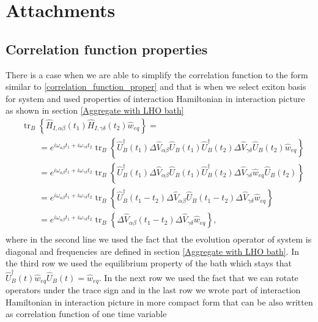 \chapter{Attachments}

\section{Correlation function properties}
\label{Correlation function properties}
There is a case when we are able to simplify the correlation function to the form similar to \ref{correlation_function_proper} and that is when we select exiton basis for system and used properties of interaction Hamiltonian in interaction picture as shown in section \ref{Aggregate with LHO bath}
\begin{equation}
\label{correlation_function_1st_compact_1}
    \begin{aligned}
    &\operatorname{tr}_B \left\{ \hat{H}_{I, \alpha \beta}(t_1) \hat{H}_{I, \gamma \delta}(t_2) \hat{w}_{eq}\right\} = \\
    &\quad \quad = e^{i \omega_{\alpha \beta}t_1 + i\omega_{\gamma \delta} t_2}\operatorname{tr}_B \left\{ \hat{U}_B^\dagger (t_1)\Delta \hat{V}_{\alpha \beta} \hat{U}_B (t_1) \hat{U}_B^\dagger (t_2) \Delta \hat{V}_{\gamma \delta} \hat{U}_B (t_2)\hat{w}_{eq}\right\} \\
    &\quad \quad = e^{i \omega_{\alpha \beta}t_1 + i\omega_{\gamma \delta} t_2}\operatorname{tr}_B \left\{ \hat{U}_B^\dagger (t_1)\Delta \hat{V}_{\alpha \beta} \hat{U}_B (t_1) \hat{U}_B^\dagger (t_2) \Delta \hat{V}_{\gamma \delta} \hat{w}_{eq} \hat{U}_B (t_2)\right\} \\
    &\quad \quad = e^{i \omega_{\alpha \beta }t_1 + i\omega_{\gamma \delta} t_2}\operatorname{tr}_B \left\{ \hat{U}_B^\dagger (t_1 - t_2)\Delta \hat{V}_{\alpha \beta} \hat{U}_B (t_1 - t_2) \Delta \hat{V}_{\gamma \delta} \hat{w}_{eq} \right\} \\
    &\quad \quad = e^{i \omega_{\alpha \beta}t_1 + i\omega_{\gamma \delta} t_2}\operatorname{tr}_B \left\{ \Delta \hat{V}_{\alpha \beta}(t_1 - t_2) \Delta \hat{V}_{\gamma \delta} \hat{w}_{eq} \right\}, \\
    \end{aligned}
\end{equation}
where in the second line we used the fact that the evolution operator of system is diagonal and frequencies are defined in section \ref{Aggregate with LHO bath}. In the third row we used the equilibrium property of the bath which stays that $\hat{U}_B^\dagger(t) \hat{w}_{eq} \hat{U}_B(t) = \hat{w}_{eq}$. In the next row we used the fact that we can rotate operators under the trace sign and in the last row we wrote part of interaction Hamiltonian in interaction picture in more compact form that can be also written as correlation function of one time variable

